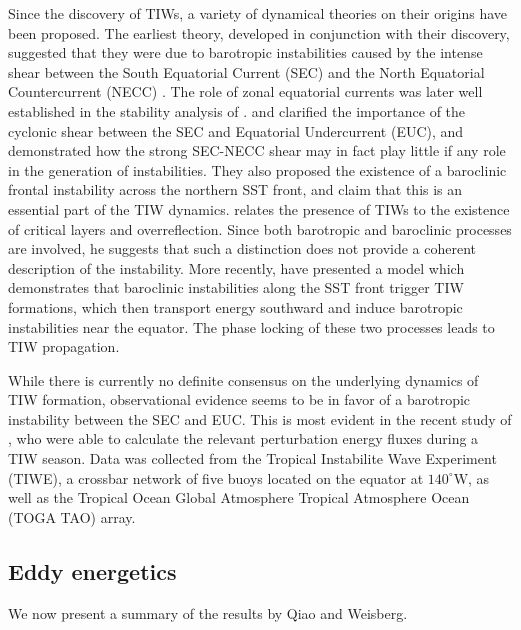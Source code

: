 \documentclass[letterpaper, 11pt, onecolumn]{article}
\newcommand{\degree}{^{\circ}} \newcommand{\abs}[1]{\lvert#1\rvert}
\begin{document}
Since the discovery of TIWs, a variety of dynamical theories on their origins
have been proposed. The earliest theory, developed in conjunction with their
discovery, suggested that they were due to barotropic instabilities caused by
the intense shear between the South Equatorial Current (SEC) and the North
Equatorial Countercurrent (NECC) \citep{Philander:1976, Philander:1978}. The
role of zonal equatorial currents was later well established in the stability
analysis of \citet{Cox:1980}. \citet{McCreary-Yu:1992} and
\citet{Yu-McCreary-Proehl:1995} clarified the importance of the cyclonic shear
between the SEC and Equatorial Undercurrent (EUC), and demonstrated how the
strong SEC-NECC shear may in fact play little if any role in the generation of
instabilities. They also proposed the existence of a baroclinic frontal
instability across the northern SST front, and claim that this is an essential
part of the TIW dynamics. \citet{Proehl:1996} relates the presence of TIWs to
the existence of critical layers and overreflection. Since both barotropic and
baroclinic processes are involved, he suggests that such a distinction does not
provide a coherent description of the instability. More recently,
\citet{Masina-Philander-Bush:1999} have presented a model which demonstrates
that baroclinic instabilities along the SST front trigger TIW formations, which
then transport energy southward and induce barotropic instabilities near the
equator. The phase locking of these two processes leads to TIW propagation.

While there is currently no definite consensus on the underlying dynamics of
TIW formation, observational evidence seems to be in favor of a barotropic
instability between the SEC and EUC. This is most evident in the recent study
of \citet{Qiao-Weisberg:1998}, who were able to calculate the relevant
perturbation energy fluxes during a TIW season. Data was collected from the
Tropical Instabilite Wave Experiment (TIWE), a crossbar network of five buoys
located on the equator at $140\degree\text{W}$, as well as the Tropical Ocean
Global Atmosphere Tropical Atmosphere Ocean (TOGA TAO) array.

\subsection{Eddy energetics} We now present a summary of the results by Qiao
and Weisberg.
\end{document}
